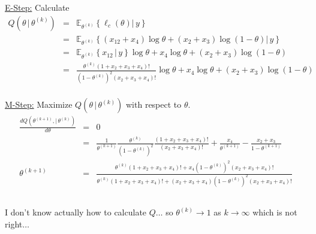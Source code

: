 \documentclass[11pt]{article}
\begin{document}
\underline{E-Step:} Calculate
\begin{eqnarray*}
  Q(\theta\,|\,\theta^{\left(k\right)})&=&\mathbb{E}_{\theta^{\left(k\right)}}\left\{\ell_c\left(\theta\right)|\,y\right\}\\
                                                  &=&\mathbb{E}_{\theta^{\left(k\right)}}\left\{\left(x_{12}+x_4\right)\log\theta+\left(x_2+x_3\right)\log\left(1-\theta\right)|\,y\right\}\\
                                                  &=&\mathbb{E}_{\theta^{\left(k\right)}}\left\{x_{12}\,|\,y\right\}\log\theta+x_4\log\theta+\left(x_2+x_3\right)\log\left(1-\theta\right)\\
                                                  &=&\frac{\theta^{\left(k\right)}\left(1+x_2+x_3+x_4\right)!}{\left(1-\theta^{\left(k\right)}\right)^2\left(x_2+x_3+x_4\right)!}\log\theta+x_4\log\theta+\left(x_2+x_3\right)\log\left(1-\theta\right)\\
\end{eqnarray*}

\underline{M-Step:} Maximize $Q(\theta\,|\,\theta^{\left(k\right)})$ with respect to $\theta$.
\begin{eqnarray*}
  \frac{dQ(\theta^{\left(k+1\right)},|\,\theta^{\left(k\right)})}{d\theta}&=&0\\
                                                                                     &=&\frac{1}{\theta^{\left(k+1\right)}}\frac{\theta^{\left(k\right)}}{\left(1-\theta^{\left(k\right)}\right)^2}\frac{\left(1+x_2+x_3+x_4\right)!}{\left(x_2+x_3+x_4\right)!}+\frac{x_4}{\theta^{\left(k+1\right)}}-\frac{x_2+x_3}{1-\theta^{\left(k+1\right)}}\\
  \theta^{\left(k+1\right)}&=&\frac{\theta^{\left(k\right)}\left(1+x_2+x_3+x_4\right)!+x_4\left(1-\theta^{\left(k\right)}\right)^2\left(x_2+x_3+x_4\right)!}{\theta^{\left(k\right)}\left(1+x_2+x_3+x_4\right)!+\left(x_2+x_3+x_4\right)\left(1-\theta^{\left(k\right)}\right)^2\left(x_2+x_3+x_4\right)!}
\end{eqnarray*}

\subsection{}

I don't know actually how to calculate $Q\dots$ so $\theta^{\left(k\right)}\rightarrow1$ as $k\rightarrow\infty$ which is not right$\dots$

\section{}
\end{document}
